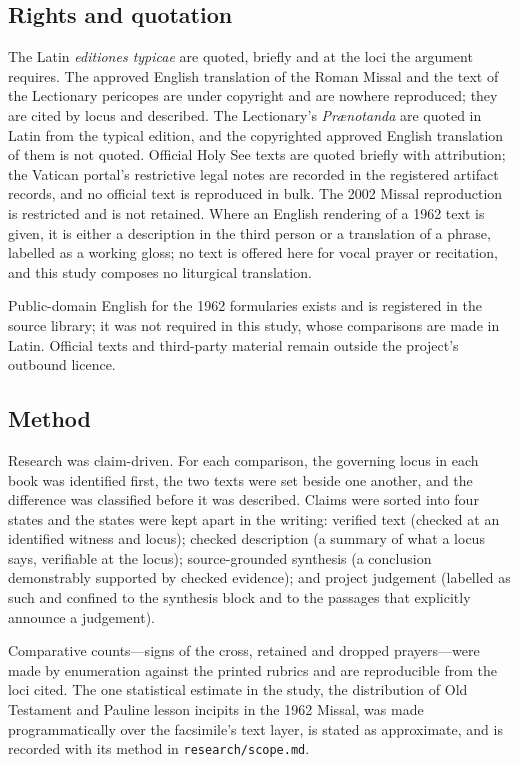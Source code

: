 \subsection*{Rights and quotation}

The Latin \emph{editiones typicae} are quoted, briefly and at the loci the argument requires. The approved English translation of the Roman Missal and the text of the Lectionary pericopes are under copyright and are nowhere reproduced; they are cited by locus and described. The Lectionary's \emph{Prænotanda} are quoted in Latin from the typical edition, and the copyrighted approved English translation of them is not quoted. Official Holy See texts are quoted briefly with attribution; the Vatican portal's restrictive legal notes are recorded in the registered artifact records, and no official text is reproduced in bulk. The 2002 Missal reproduction is restricted and is not retained. Where an English rendering of a 1962 text is given, it is either a description in the third person or a translation of a phrase, labelled as a working gloss; no text is offered here for vocal prayer or recitation, and this study composes no liturgical translation.

Public-domain English for the 1962 formularies exists and is registered in the source library; it was not required in this study, whose comparisons are made in Latin. Official texts and third-party material remain outside the project's outbound licence.

\subsection*{Method}

Research was claim-driven. For each comparison, the governing locus in each book was identified first, the two texts were set beside one another, and the difference was classified before it was described. Claims were sorted into four states and the states were kept apart in the writing: verified text (checked at an identified witness and locus); checked description (a summary of what a locus says, verifiable at the locus); source-grounded synthesis (a conclusion demonstrably supported by checked evidence); and project judgement (labelled as such and confined to the synthesis block and to the passages that explicitly announce a judgement).

Comparative counts---signs of the cross, retained and dropped prayers---were made by enumeration against the printed rubrics and are reproducible from the loci cited. The one statistical estimate in the study, the distribution of Old Testament and Pauline lesson incipits in the 1962 Missal, was made programmatically over the facsimile's text layer, is stated as approximate, and is recorded with its method in \texttt{research/scope.md}.

